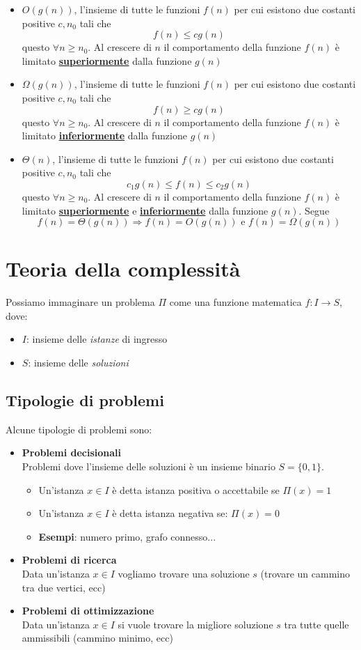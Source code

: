 \begin{itemize}
\begin{itemize}
		\item $O(g(n))$, l'insieme di tutte le funzioni $f(n)$ per cui esistono due costanti positive $c,n_0$ tali che 
		$$f(n) \leq c g(n)$$
		questo $\forall n \geq n_0$. Al crescere di $n$ il comportamento della funzione $f(n)$ è limitato \textbf{\underline{superiormente}} dalla funzione $g(n)$
		\item $\Omega(g(n))$, l'insieme di tutte le funzioni $f(n)$ per cui esistono due costanti positive $c,n_0$ tali che 
		$$f(n) \geq c g(n)$$
		questo $\forall n \geq n_0$. Al crescere di $n$ il comportamento della funzione $f(n)$ è limitato \textbf{\underline{inferiormente}} dalla funzione $g(n)$
		\item $\Theta(n)$, l'insieme di tutte le funzioni $f(n)$ per cui esistono due costanti positive $c,n_0$ tali che
		$$c_1 g(n) \leq f(n) \leq c_2 g(n)$$
		questo $\forall n \geq n_0$. Al crescere di $n$ il comportamento della funzione $f(n)$ è limitato \textbf{\underline{superiormente}} e \textbf{\underline{inferiormente}} dalla funzione $g(n)$. Segue
		$$f(n)=\Theta(g(n)) \Longrightarrow f(n)=O(g(n)) \text{ e } f(n)=\Omega(g(n))$$
	\end{itemize}
\end{itemize}

\section{Teoria della complessità}
Possiamo immaginare un problema $\Pi$ come una funzione matematica $f: I \to S$, dove:
\begin{itemize}
	\item $I$: insieme delle \emph{istanze} di ingresso
	\item $S$: insieme delle \emph{soluzioni}
\end{itemize}
\subsection{Tipologie di problemi}
Alcune tipologie di problemi sono:
\begin{itemize}
	\item \textbf{Problemi decisionali}\\ Problemi dove l'insieme delle soluzioni è un insieme binario $S = \{0, 1\}$. 
	\begin{itemize}
		\item Un'istanza $x \in I$ è detta istanza positiva o accettabile se $\Pi(x) = 1$ 
		\item Un'istanza $x \in I$ è detta istanza negativa se: $\Pi(x) = 0$
		\item \textbf{Esempi}: numero primo, grafo connesso...
	\end{itemize}
	\item \textbf{Problemi di ricerca}\\Data un'istanza $x \in I$ vogliamo trovare una soluzione $s$ (trovare un cammino tra due vertici, ecc)
	\item \textbf{Problemi di ottimizzazione}\\Data un'istanza $x \in I$ si vuole trovare la migliore soluzione $s$ tra tutte quelle ammissibili (cammino minimo, ecc)
\end{itemize}
